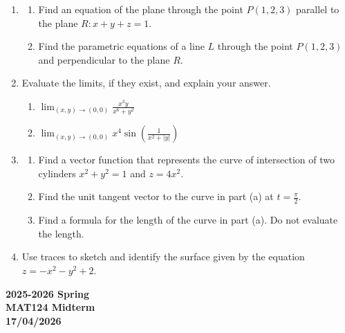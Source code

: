 \documentclass[a4paper, 12pt]{article}
\begin{document}
\begin{enumerate}[leftmargin=*,label=\textbf{\arabic*.}]
\begin{enumerate}[leftmargin=*,label=\textbf{\alph*.}]
\end{enumerate}

\item \begin{enumerate}[leftmargin=*,label=\textbf{\alph*.}]
\item Find an equation of the plane through the point $P(1,2,3)$ parallel to the plane $R: x+y+z=1$.
\item Find the parametric equations of a line $L$ through the point $P(1,2,3)$ and perpendicular to the plane $R$.
\end{enumerate}

\item Evaluate the limits, if they exist, and explain your answer.

\begin{enumerate}[leftmargin=*,label=\textbf{\alph*.}]
\item $\displaystyle\lim_{(x,y)\to(0,0)}\frac{x^3y}{x^6+y^2}$ 
\item $\displaystyle\lim_{(x,y)\to(0,0)}x^4\sin\left(\frac1{x^2+\left|y\right|}\right)$ \ \ \ 
\end{enumerate}

\item \begin{enumerate}[leftmargin=*,label=\textbf{\alph*.}]
\item Find a vector function that represents the curve of intersection of two cylinders $x^2+y^2=1$ and $z=4x^2$.
\item Find the unit tangent vector to the curve in part (a) at $\displaystyle t=\frac\pi2$.
\item Find a formula for the length of the curve in part (a). Do not evaluate the length.
\end{enumerate}

\item Use traces to sketch and identify the surface given by the equation $z=-x^2-y^2+2$.
\end{enumerate}

\newpage
{}
{}
\begin{center}
\textbf{2025-2026 Spring \\MAT124 Midterm\\17/04/2026}
\end{center}
\end{document}
